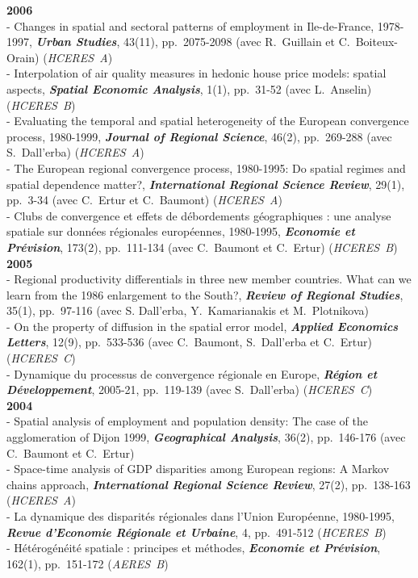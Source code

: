 \documentclass[a4paper,12pt]{article}
\begin{document}
\noindent \textbf{2006}  \smallskip \\ 
- Changes in spatial and sectoral patterns of employment in Ile-de-France, 1978-1997, \textit{\textbf{Urban Studies}}, 43(11), pp.~2075-2098 (avec R.~Guillain et C.~Boiteux-Orain) (\textit{HCERES~A}) \\
 - Interpolation of air quality measures in hedonic house price models: spatial aspects, \textit{\textbf{Spatial Economic Analysis}}, 1(1), pp.~31-52 (avec L.~Anselin) (\textit{HCERES~B}) \\
 - Evaluating the temporal and spatial heterogeneity of the European convergence process, 1980-1999, \textit{\textbf{Journal of Regional Science}}, 46(2), pp.~269-288 (avec S.~Dall'erba) (\textit{HCERES~A}) \\
 - The European regional convergence process, 1980-1995: Do spatial regimes and spatial dependence matter?, \textit{\textbf{International Regional Science Review}}, 29(1), pp.~3-34 (avec C.~Ertur et C.~Baumont) (\textit{HCERES~A}) \\
 - Clubs de convergence et effets de débordements géographiques : une analyse spatiale sur données régionales européennes, 1980-1995, \textit{\textbf{Economie et Prévision}}, 173(2), pp.~111-134 (avec C.~Baumont et C.~Ertur) (\textit{HCERES~B}) \\

\noindent \textbf{2005}  \smallskip \\ 
- Regional productivity differentials in three new member countries. What can we learn from the 1986 enlargement to the South?, \textit{\textbf{Review of Regional Studies}}, 35(1), pp.~97-116 (avec S. Dall'erba, Y.~Kamarianakis et M.~Plotnikova) \\
 - On the property of diffusion in the spatial error model, \textit{\textbf{Applied Economics Letters}}, 12(9), pp.~533-536 (avec C.~Baumont, S.~Dall'erba et C.~Ertur) (\textit{HCERES~C}) \\
 - Dynamique du processus de convergence régionale en Europe, \textit{\textbf{Région et Développement}}, 2005-21, pp.~119-139 (avec S.~Dall'erba) (\textit{HCERES~C}) \\
		
\noindent \textbf{2004}  \smallskip \\ 
- Spatial analysis of employment and population density: The case of the agglomeration of Dijon 1999, \textit{\textbf{Geographical Analysis}}, 36(2), pp.~146-176 (avec C.~Baumont et C.~Ertur) \\ 
 - Space-time analysis of GDP disparities among European regions: A Markov chains approach, \textit{\textbf{International Regional Science Review}}, 27(2), pp.~138-163 (\textit{HCERES~A}) \\
 - La dynamique des disparités régionales dans l'Union Européenne, 1980-1995, \textit{\textbf{Revue d'Economie Régionale et Urbaine}}, 4, pp.~491-512 (\textit{HCERES~B}) \\
 - Hétérogénéité spatiale : principes et méthodes, \textit{\textbf{Economie et Prévision}}, 162(1), pp.~151-172 (\textit{AERES~B}) \\
\end{document}
